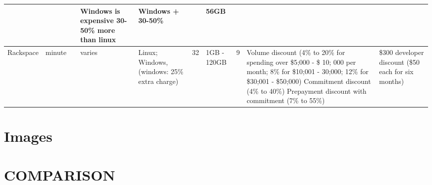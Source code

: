 \documentclass{sig-alternate}
\begin{document}
\begin{table}
\begin{small}
\begin{tabular}{|p{2cm}|p{2cm}|p{1.5cm}|p{1.5cm}|p{2cm}|p{1cm}|p{1.5cm}|p{2cm}|p{2cm}|p{2cm}|}
 &  &  & Windows is expensive 30-50\% more than linux & Windows + 30-50\%  &  & 56GB &  &  & \\
\hline 
Rackspace & minute &  & varies & Linux; Windows, (windows: 25\% extra charge) & 32 & 1GB - 120GB  & 9 & Volume discount (4\% to 20\% for spending over \$5;000 - \$ 10; 000 per month; 8\% for \$10;001 - 30;000; 12\% for \$30;001 - \$50;000) Commitment discount (4\% to 40\%) Prepayment discount with commitment (7\% to 55\%)& \$300 developer discount (\$50 each for six months)\\
\hline
\end{tabular}
\end{small}
\end{table}


\section{Images}

\section{COMPARISON}

% 
\end{document}

